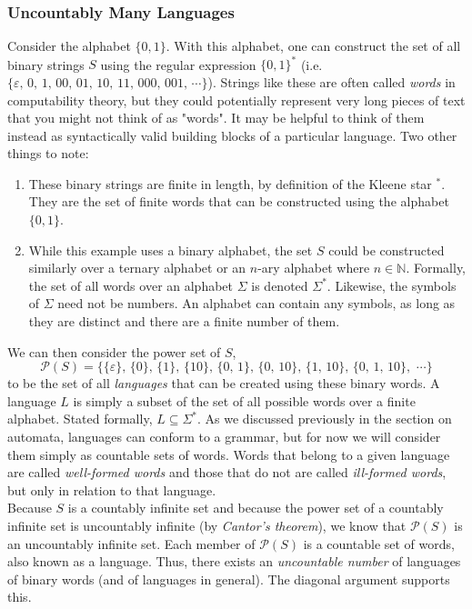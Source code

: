 \subsubsection{Uncountably Many Languages}

Consider the alphabet $\{0,1\}$. With this alphabet, one can construct the set of all binary strings $S$ using the regular expression $\{0,1\}^*$ (i.e. $\{\varepsilon,\,0,\,1,\,00,\,01,\,10,\,11,\,000,\,001,\,\cdots\}$). Strings like these are often called \textit{words} in computability theory, but they could potentially represent very long pieces of text that you might not think of as "words". It may be helpful to think of them instead as syntactically valid building blocks of a particular language. Two other things to note:
\begin{enumerate}
	\item These binary strings are finite in length, by definition of the Kleene star $^*$. They are the set of finite words that can be constructed using the alphabet $\{0,1\}$.
	\item While this example uses a binary alphabet, the set $S$ could be constructed similarly over a ternary alphabet or an $n$-ary alphabet where $n\in \mathbb{N}$. Formally, the set of all words over an alphabet $\Sigma$ is denoted $\Sigma^*$. Likewise, the symbols of $\Sigma$ need not be numbers. An alphabet can contain any symbols, as long as they are distinct and there are a finite number of them. \\
\end{enumerate}

We can then consider the power set of $S$,
$$\mathcal{P}(S)=\{\{\varepsilon\},\,\{0\},\,\{1\},\,\{10\},\,\{0,\,1\},\,\{0,\,10\},\,\{1,\,10\},\,\{0,\,1,\,10\},\,\,\cdots\}$$
to be the set of all \textit{languages} that can be created using these binary words. A language $L$ is simply a subset of the set of all possible words over a finite alphabet. Stated formally, $L\subseteq\Sigma^*$. As we discussed previously in the section on automata, languages can conform to a grammar, but for now we will consider them simply as countable sets of words. Words that belong to a given language are called \textit{well-formed words} and those that do not are called \textit{ill-formed words}, but only in relation to that language. \\

Because $S$ is a countably infinite set and because the power set of a countably infinite set is uncountably infinite (by \textit{Cantor's theorem}), we know that $\mathcal{P}(S)$ is an uncountably infinite set. Each member of $\mathcal{P}(S)$ is a countable set of words, also known as a language. Thus, there exists an \textit{uncountable number} of languages of binary words (and of languages in general). The diagonal argument supports this. \\

